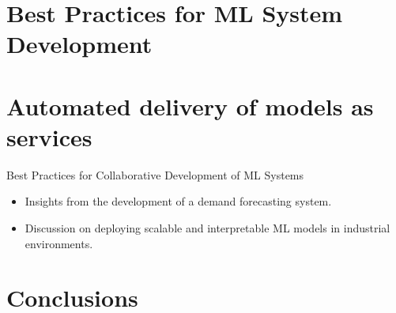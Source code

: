 



\section{Best Practices for ML System Development}
\label{sec:best_practices_ml_system_development}




\section{Automated delivery of models as services}
\label{sec:automated_delivery_models_services}


%

Best Practices for Collaborative Development of ML Systems
\begin{itemize}
    \item Insights from the development of a demand forecasting system.
    \item Discussion on deploying scalable and interpretable ML models in industrial environments.
\end{itemize}




\section{Conclusions}
